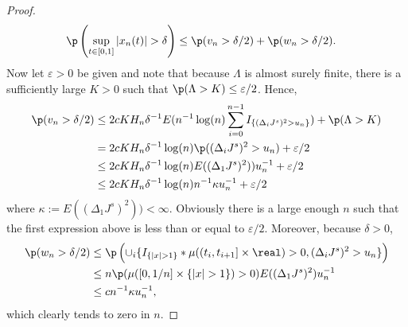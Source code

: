 \begin{proof}
    \begin{align}
      \p &\left(  \sup_{t \in \domain}\vert x_n (t) \vert  > \delta\right) \le \p(v_n > \delta/2) + \p(w_n > \delta/2) \notag. 
      \label{}
    \end{align}
  Now let  $\varepsilon > 0$ be given and note that because  $\Lambda$ is almost surely finite,   there is a sufficiently large $K > 0$ such that $\p(\Lambda > K) \le \varepsilon/2$. Hence,  \begin{align} \p(v_n > \delta /2) & \le 2cKH_n\delta^{-1}E(n^{-1} \log(n) \sumin I_{\{(\djt)^2 > u_n\}}) + \p(\Lambda > K) \notag  \\ & = 2cK H_n\delta^{-1}\log(n) \p( (\djt)^2 > u_n)  + \varepsilon/2 \notag \\ &\le  2cK H_n\delta^{-1}\log(n) E((\Delta_1 J^s)^2))u_n^{-1}   + \varepsilon/2 \notag \\ &\le 2cKH_n\delta^{-1} \log(n) n^{-1}\kappa u_n^{-1} +  \varepsilon/2\label{eq:asabove} \end{align} where $\kappa := E((\Delta_1 J^s)^2)) < \infty$.  Obviously there is a large enough $n$ such that the first expression above is less than or equal to $\varepsilon/2$.   Moreover, because $\delta >  0$,  \begin{align} \p(w_n > \delta/2) & \le \p\left(\cup_i\{I_{\{\vert x \vert > 1\}}\ast \mu( (t_i, t_{i + 1}] \times \real) > 0   , (\djt)^2 > u_n\}\right) \notag \\ & \le n \p(\mu( [0, 1/n] \times \{\vert x \vert > 1\}) > 0 ) E( (\Delta_1 J^s)^2) u_n^{-1} \notag \\ & \le c n^{-1} \kappa u_n^{-1}\notag,\end{align} which clearly tends to zero in $n$. 


\end{proof}
